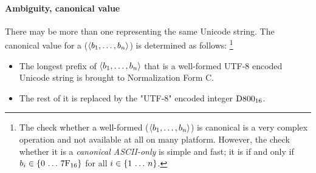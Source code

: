 \paragraph{Ambiguity, canonical value}

There may be more than one  representing the same Unicode string.
The canonical value for a ($\langle b_1, \ldots, b_n \rangle$) is determined
as follows:%
\footnote{
    The check whether a well-formed ($\langle b_1, \ldots, b_n \rangle$) is canonical
    is a very complex operation and not available at all on many platform.
    However, the check whether it is a \emph{canonical ASCII-only}  is simple and fast;
    it is if and only if $b_i \in \{0 \,\ldots\, \mathrm{7F}_{16}\}$ for all $i \in \{1 \,\ldots\, n\}$.
}
\begin{itemize}
    \item
    The longest prefix of $\langle b_1, \ldots, b_n \rangle$ that is a well-formed UTF-8 encoded Unicode string
    is brought to Normalization Form C.

    \item
    The rest of it is replaced by the "UTF-8" encoded integer $\mathrm{D800}_{16}$.
\end{itemize}
